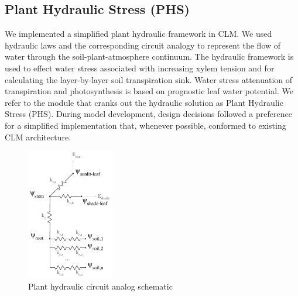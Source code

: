 \documentclass[draft,linenumbers]{agujournal}
\begin{document}
\subsection{Plant Hydraulic Stress (PHS)}
  We implemented a simplified plant hydraulic framework in CLM. 
  We used hydraulic laws and the corresponding circuit analogy to represent the 
  flow of water through the soil-plant-atmosphere continuum. 
  The hydraulic framework is used to effect water stress associated with increasing xylem tension
  and for calculating the layer-by-layer soil transpiration sink. 
  Water stress attenuation of transpiration and photosynthesis is based on prognostic leaf water potential. 
  We refer to the module that cranks out the hydraulic solution as Plant Hydraulic Stress (PHS).
  During model development, design decisions followed a preference for a simplified implementation that,
  whenever possible, conformed to existing CLM architecture.
  
  \begin{figure}[h]
     \centering
     \includegraphics[width=9pc]{../figs/circuit.pdf}
     \caption{Plant hydraulic circuit analog schematic}
     \label{circuit}
  \end{figure}
\end{document}
